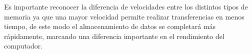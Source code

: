 \documentclass{article}
\begin{document}
Es importante reconocer la diferencia de velocidades entre los distintos tipos de memoria ya que una mayor velocidad permite realizar transferencias en menos tiempo, de este modo el almacenamiento de datos se completará más rápidamente, marcando una diferencia importante en el rendimiento del computador.
\newpage


\end{document}
